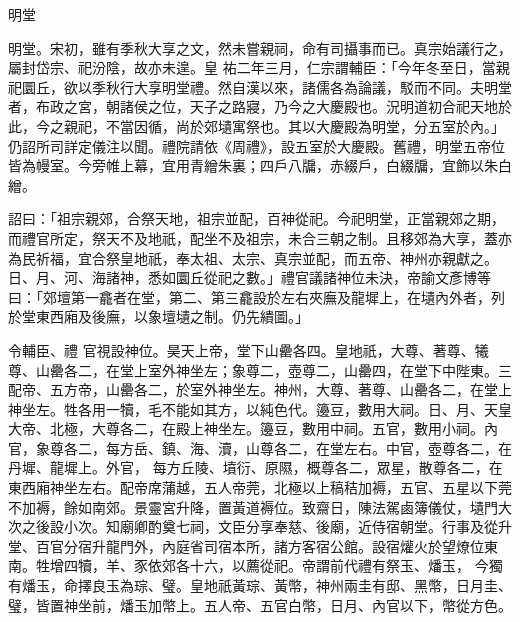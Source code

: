 
\begin{pinyinscope}

 明堂



 明堂。宋初，雖有季秋大享之文，然未嘗親祠，命有司攝事而已。真宗始議行之，屬封岱宗、祀汾陰，故亦未遑。皇
 祐二年三月，仁宗謂輔臣：「今年冬至日，當親祀圜丘，欲以季秋行大享明堂禮。然自漢以來，諸儒各為論議，駁而不同。夫明堂者，布政之宮，朝諸侯之位，天子之路寢，乃今之大慶殿也。況明道初合祀天地於此，今之親祀，不當因循，尚於郊壝寓祭也。其以大慶殿為明堂，分五室於內。」仍詔所司詳定儀注以聞。禮院請依《周禮》，設五室於大慶殿。舊禮，明堂五帝位皆為幔室。今旁帷上幕，宜用青繒朱裏；四戶八牖，赤綴戶，白綴牖，宜飾以朱白
 繒。



 詔曰：「祖宗親郊，合祭天地，祖宗並配，百神從祀。今祀明堂，正當親郊之期，而禮官所定，祭天不及地祇，配坐不及祖宗，未合三朝之制。且移郊為大享，蓋亦為民祈福，宜合祭皇地祇，奉太祖、太宗、真宗並配，而五帝、神州亦親獻之。日、月、河、海諸神，悉如圜丘從祀之數。」禮官議諸神位未決，帝諭文彥博等曰：「郊壇第一龕者在堂，第二、第三龕設於左右夾廡及龍墀上，在壝內外者，列於堂東西廂及後廡，以象壇壝之制。仍先繢圖。」



 令輔臣、禮
 官視設神位。昊天上帝，堂下山罍各四。皇地祇，大尊、著尊、犧尊、山罍各二，在堂上室外神坐左；象尊二，壺尊二，山罍四，在堂下中陛東。三配帝、五方帝，山罍各二，於室外神坐左。神州，大尊、著尊、山罍各二，在堂上神坐左。牲各用一犢，毛不能如其方，以純色代。籩豆，數用大祠。日、月、天皇大帝、北極，大尊各二，在殿上神坐左。籩豆，數用中祠。五官，數用小祠。內官，象尊各二，每方岳、鎮、海、瀆，山尊各二，在堂左右。中官，壺尊各二，在丹墀、龍墀上。外官，
 每方丘陵、墳衍、原隰，概尊各二，眾星，散尊各二，在東西廂神坐左右。配帝席蒲越，五人帝莞，北極以上稿秸加褥，五官、五星以下莞不加褥，餘如南郊。景靈宮升降，置黃道褥位。致齋日，陳法駕鹵簿儀仗，壝門大次之後設小次。知廟卿酌奠七祠，文臣分享奉慈、後廟，近侍宿朝堂。行事及從升堂、百官分宿升龍門外，內庭省司宿本所，諸方客宿公館。設宿爟火於望燎位東南。牲增四犢，羊、豕依郊各十六，以薦從祀。帝謂前代禮有祭玉、燔玉，
 今獨有燔玉，命擇良玉為琮、璧。皇地祇黃琮、黃幣，神州兩圭有邸、黑幣，日月圭、璧，皆置神坐前，燔玉加幣上。五人帝、五官白幣，日月、內官以下，幣從方色。




\end{pinyinscope}
